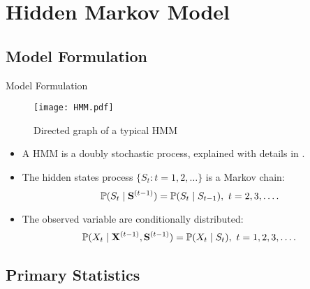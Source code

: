 
\section{\large Hidden Markov Model}


\subsection{Model Formulation}

\begin{frame}[fragile,t]{Model Formulation}
	\begin{figure}[!hbt]
    \center
    \texttt{[image: HMM.pdf]}
    \caption{Directed graph of a typical HMM}
    \label{fig:HMM:overview}
    \end{figure}

    \begin{itemize}
	\item A HMM is a \alert{doubly stochastic process}, explained with details in \cite{Zucchini:2009df}.
	\item The hidden states process $\{S_t \colon t = 1,2,\dots\}$ is a Markov chain:
		\[ \mathbb{P}(S_t \mid {\mathbf S}^{(t-1)}) = \mathbb{P}(S_t \mid S_{t-1}),\ t = 2,3,\dots. \]
	\item The observed variable are conditionally distributed:
		\[ \mathbb{P}(X_t \mid {\mathbf X}^{(t-1)}, {\mathbf S}^{(t-1)}) = \mathbb{P}(X_t \mid S_t),\ t = 1,2,3,\dots. \]
	\end{itemize}
\end{frame}


\subsection{Primary Statistics}

